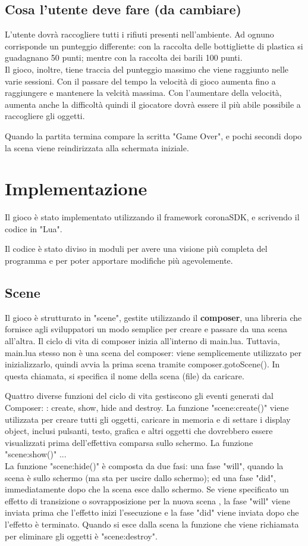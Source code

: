 \documentclass[12pt]{article}
\begin{document}
\subsection{Cosa l'utente deve fare (da cambiare)}
 
L'utente dovrà raccogliere tutti i rifiuti presenti nell'ambiente. Ad ognuno corrisponde un punteggio differente: con la raccolta delle bottigliette di plastica si guadagnano 50 punti; mentre con la raccolta dei barili 100 punti. 
\\Il gioco, inoltre, tiene traccia del punteggio massimo che viene raggiunto nelle varie sessioni.
Con il passare del tempo la velocità di gioco aumenta fino a raggiungere e mantenere la velcità massima. Con l'aumentare della velocità, aumenta anche la difficoltà quindi il giocatore dovrà essere il più abile possibile a raccogliere gli oggetti. 


Quando la partita termina compare la scritta "Game Over", e pochi secondi dopo la scena viene reindirizzata alla schermata iniziale. 

\section{Implementazione}
Il gioco è stato implementato utilizzando il framework coronaSDK, e scrivendo il codice in "Lua". 


Il codice è stato diviso in moduli per avere una visione più completa del programma e per poter apportare modifiche più agevolemente. 
\subsection{Scene}
Il gioco è strutturato in "scene", gestite utilizzando il \textbf{composer}, una libreria che fornisce agli sviluppatori  un modo semplice per creare e passare da una scena all'altra. Il ciclo di vita di composer inizia all'interno di main.lua. Tuttavia, main.lua stesso non è una scena del composer: viene semplicemente utilizzato per inizializzarlo, quindi avvia la prima scena tramite composer.gotoScene(). In questa chiamata, si specifica il nome della scena (file) da caricare. 

Quattro diverse funzioni del ciclo di vita gestiscono gli eventi generati dal Composer: : create, show, hide and destroy.
La funzione "scene:create()" viene utilizzata per creare tutti gli oggetti, caricare in memoria e di settare i display object, inclusi pulsanti, testo, grafica e altri oggetti che dovrebbero essere visualizzati prima dell'effettiva comparsa sullo schermo.
La funzione "scene:show()" ... \\
La funzione "scene:hide()" è composta da due fasi: una fase "will", quando la scena è sullo schermo (ma sta per uscire dallo schermo); ed una fase "did", immediatamente dopo che la scena esce dallo schermo. Se viene specificato un effetto di transizione o sovrapposizione per la nuova scena , la fase "will" viene inviata prima che l'effetto inizi l'esecuzione e la fase "did" viene inviata dopo che l'effetto è terminato.
Quando si esce dalla scena la funzione che viene richiamata per eliminare gli oggetti è "scene:destroy". 
\\
\end{document}
